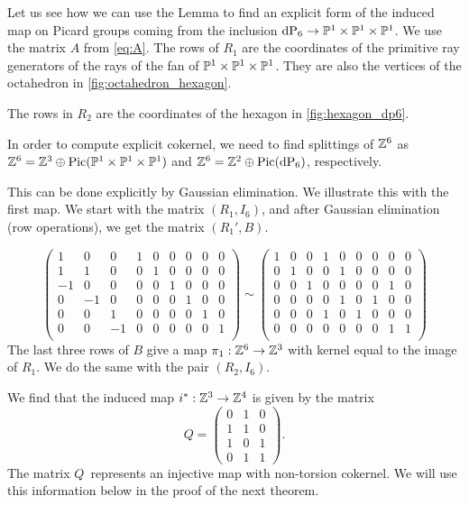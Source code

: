 \begin{example}
\label{example:p1p1p1}

Let us see how we can use the Lemma to find an explicit form of the induced map on Picard groups coming from the inclusion $\dP6 \to \P^1 \times \P^1 \times \P^1$. We use the matrix $A$ from \cref{eq:A}. The rows of $R_1$ are the coordinates of the primitive ray generators of the rays of the fan of $\P^1 \times \P^1 \times  \P^1$. They are also the vertices of the octahedron in \cref{fig:octahedron_hexagon}.


The rows in $R_2$ are the coordinates of the hexagon in \cref{fig:hexagon_dp6}.

In order to compute explicit cokernel, we need to find splittings of $\Z^6$ as $\Z^6 = \Z^3 \oplus \Pic (\P^1 \times \P^1 \times \P^1)$ and $\Z^6 = \Z^2 \oplus \Pic(\dP6)$, respectively.

This can be done explicitly by Gaussian elimination. We illustrate this with the first map. We start with the matrix $(R_1,I_6)$, and after Gaussian elimination (row operations), we get the matrix $(R_1',B)$.

\[
\left(
\begin{array}{ccc|cccccc}
1 & 0 & 0  & 1 & 0 & 0 & 0 & 0 & 0 \\
1 & 1 & 0  & 0 & 1 & 0 & 0 & 0 & 0 \\
-1& 0 & 0  & 0 & 0 & 1 & 0 & 0 & 0 \\
0 &-1 & 0  & 0 & 0 & 0 & 1 & 0 & 0 \\
0 & 0 & 1  & 0 & 0 & 0 & 0 & 1 & 0 \\
0 & 0 &-1  & 0 & 0 & 0 & 0 & 0 & 1 \\
\end{array} \right)
\sim \left(
\begin{array}{ccc|cccccc}
1 & 0 & 0  & 1 & 0 & 0 & 0 & 0 & 0 \\
0 & 1 & 0  & 0 & 1 & 0 & 0 & 0 & 0 \\
0 & 0 & 1  & 0 & 0 & 0 & 0 & 1 & 0 \\
0 & 0 & 0  & 0 & 1 & 0 & 1 & 0 & 0 \\
0 & 0 & 0  & 1 & 0 & 1 & 0 & 0 & 0 \\
0 & 0 & 0  & 0 & 0 & 0 & 0 & 1 & 1 \\
\end{array}\right)
\]
The last three rows of $B$ give a map $\pi_1: \Z^6 \to \Z^3$ with kernel equal to the image of $R_1$. We do the same with the pair $(R_2,I_6)$.

We find that the induced map $i^\ast: \Z^3 \to \Z^4$ is given by the matrix
\[
Q = \begin{pmatrix}
0 & 1 & 0 \\
1 & 1 & 0 \\
1 & 0 & 1 \\
0 & 1 & 1
\end{pmatrix}. 
\]
The matrix $Q$ represents an injective map with non-torsion cokernel. We will use this information below in the proof of the next theorem.
\end{example}

